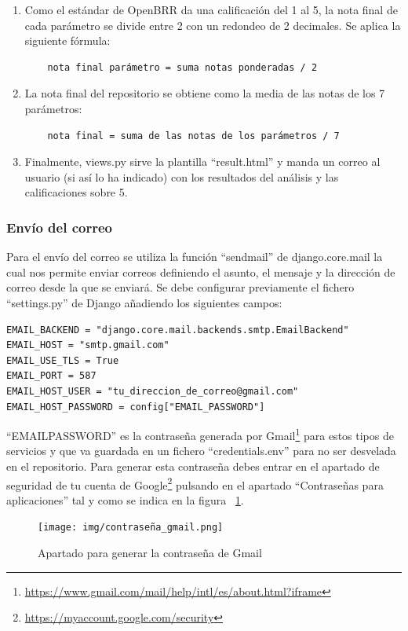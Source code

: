 \documentclass[a4paper, 12pt]{book}
\begin{document}
\begin{enumerate}
	\item Como el estándar de OpenBRR da una calificación del 1 al 5, la nota final de cada parámetro se divide entre 2 con un redondeo de 2 decimales. Se aplica la siguiente fórmula:
	\begin{verbatim}
	nota final parámetro = suma notas ponderadas / 2
	\end{verbatim}
	\item La nota final del repositorio se obtiene como la media de las notas de los 7 parámetros:
	\begin{verbatim}
	nota final = suma de las notas de los parámetros / 7
	\end{verbatim}
	\item Finalmente, views.py sirve la plantilla ``result.html'' y manda un correo al usuario (si así lo ha indicado) con los resultados del análisis y las calificaciones sobre 5.
\end{enumerate}
\subsubsection{Envío del correo}
Para el envío del correo se utiliza la función ``send\textunderscore mail'' de django.core.mail la cual nos permite enviar correos definiendo el asunto, el mensaje y la dirección de correo desde la que se enviará. Se debe configurar previamente el fichero ``settings.py'' de Django añadiendo los siguientes campos:
\begin{verbatim}
EMAIL_BACKEND = "django.core.mail.backends.smtp.EmailBackend"
EMAIL_HOST = "smtp.gmail.com"
EMAIL_USE_TLS = True
EMAIL_PORT = 587
EMAIL_HOST_USER = "tu_direccion_de_correo@gmail.com"
EMAIL_HOST_PASSWORD = config["EMAIL_PASSWORD"]
\end{verbatim}
``EMAIL\textunderscore PASSWORD'' es la contraseña generada por Gmail\footnote{\url{https://www.gmail.com/mail/help/intl/es/about.html?iframe}} para estos tipos de servicios y que va guardada en un fichero ``credentials.env'' para no ser desvelada en el repositorio. Para generar esta contraseña debes entrar en el apartado de seguridad de tu cuenta de Google\footnote{\url{https://myaccount.google.com/security}} pulsando en el apartado ``Contraseñas para aplicaciones'' tal y como se indica en la figura ~\ref{fig:contraseña gmail}.
\begin{figure}
    \centering
    \texttt{[image: img/contraseña\_gmail.png]}
    \caption{Apartado para generar la contraseña de Gmail}\label{fig:contraseña gmail}
\end{figure}
\end{document}
